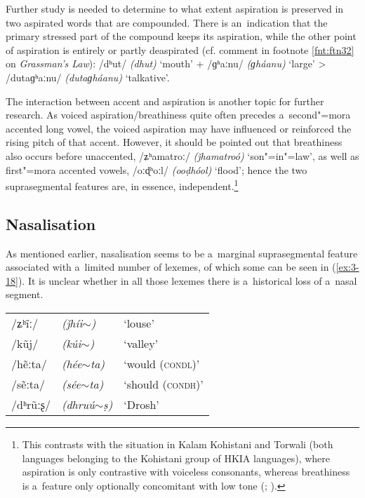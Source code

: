 Further study is needed to determine to what extent aspiration is preserved in two aspirated words that are compounded. There is an~indication that the primary stressed part of the compound keeps its aspiration, while the other point of aspiration is entirely or partly deaspirated (cf. comment in footnote \ref{fnt:ftn32} on \textit{Grassman's Law}): /dʰut/ \textit{(dhut)} `mouth' + /ɡʰaːnu/ \textit{(ɡháanu)} `large' {\textgreater} /dutaɡʰaːnu/ \textit{(dutaɡháanu)} `talkative'.


The interaction between accent and aspiration is another topic for further research. As voiced aspiration/breathiness quite often precedes a~second"=mora accented long vowel, the voiced aspiration may have influenced or reinforced the rising pitch of that accent. However, it should be pointed out that breathiness also occurs before unaccented, /ʑʰamatroː/ \textit{(ǰhamatroó)} `son"=in"=law', as well as first"=mora accented vowels, /oːɖʰoːl/ \textit{(ooḍhóol)} `flood'; hence the two suprasegmental features are, in essence, independent.\footnote{This contrasts with the situation in Kalam Kohistani and Torwali (both languages belonging to the Kohistani group of HKIA languages), where aspiration is only contrastive with voiceless consonants, whereas breathiness is a~feature only optionally concomitant with low tone (\citealt[92]{baart1999b}; \citealt[36--37]{lunsford2001}). } 


\subsection{Nasalisation}
\label{subsec:3-4-2}


As mentioned earlier, nasalisation seems to be a~marginal suprasegmental feature associated with a~limited number of lexemes, of which some can be seen in (\ref{ex:3-18}). It is unclear whether in all those lexemes there is a~historical loss of a~nasal segment.


\begin{exe}
\extab
\label{ex:3-18}
\begin{tabularx}{\textwidth}{ l l l }
/ʑʰ\~{i}ː/ &
\textit{(ǰhíi$\sim$) } &
`louse'\\
/kũj/ &
\textit{(kúi$\sim$)} &
`valley'\\
/hẽːta/ &
\textit{(hée$\sim$ta)} &
`would (\textsc{condl)}'\\
/sẽːta/ &
\textit{(sée$\sim$ta)} &
`should (\textsc{condh)}'\\
/dʰrũːʂ/ &
\textit{(dhruú$\sim$ṣ)} &
`Drosh'\\
\end{tabularx}
\end{exe}


